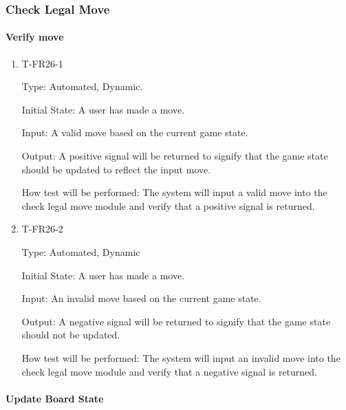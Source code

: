 \documentclass[12pt, titlepage]{article}
\begin{document}
\subsubsection{Check Legal Move}
		
    \paragraph{Verify move}
    
        \begin{enumerate}
        
            \item{T-FR26-1\\}
            
                Type: Automated, Dynamic.
                					
                Initial State: A user has made a move.
                					
                Input: A valid move based on the current game state.
                					
                Output: A positive signal will be returned to signify that the game state should be updated to reflect the input move.
                					
                How test will be performed: The system will input a valid move into the check legal move module and verify that a positive signal is returned.
            
            \item{T-FR26-2\\}
            
                Type: Automated, Dynamic
                					
                Initial State: A user has made a move.
                					
                Input: An invalid move based on the current game state.
                					
                Output: A negative signal will be returned to signify that the game state should not be updated.
                					
                How test will be performed: The system will input an invalid move into the check legal move module and verify that a negative signal is returned.
        
        \end{enumerate}
    
    \paragraph{Update Board State}
\end{document}
